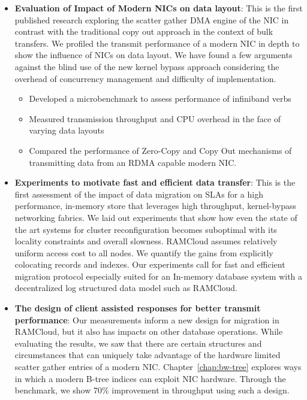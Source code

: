 \begin{itemize}

\item{\textbf{Evaluation of Impact of Modern NICs on data layout}}: This is the first published research exploring the scatter gather DMA engine of the NIC in contrast with the traditional copy out approach in the context of bulk transfers. 
 We profiled the transmit performance of a modern NIC in depth to show the influence of NICs on data layout. 
 We have found a few arguments against the blind use of the new kernel bypass approach considering
 the overhead of concurrency management and difficulty of implementation.
\begin{itemize}

\item Developed a microbenchmark to assess performance of infiniband verbs

\item Measured transmission throughput and CPU overhead in the face of varying
data layouts

\item Compared the performance of Zero-Copy and Copy Out mechanisms of 
transmitting data from an RDMA capable modern NIC.

\end{itemize} 


\item{\textbf{Experiments to motivate fast and efficient data transfer}}: This is the first assessment of the impact of data migration on SLAs for a high performance,
  in-memory store that leverages high throughput, kernel-bypass networking fabrics. 
We laid out experiments that show how even the state of the art systems for cluster reconfiguration becomes suboptimal with its locality constraints and overall slowness. 
 RAMCloud assumes relatively uniform access cost to all nodes.
 We quantify the gains from explicitly colocating records and indexes.
 Our experiments call for fast and efficient migration protocol especially suited for an In-memory database system with a decentralized log structured data model such as RAMCloud.

\item{\textbf{The design of client assisted responses for better transmit performance}}: Our measurements inform a new design for migration in RAMCloud, but it also has impacts on other database operations.
 While evaluating the results, we saw that there are certain structures and circumstances that can uniquely take advantage of the hardware limited scatter gather entries of a modern NIC.
 Chapter~\ref{chap:bw-tree} explores ways in which a modern B-tree indices can exploit NIC hardware.
 Through the benchmark, we show 70\% improvement in throughput using such a design.



\end{itemize}
